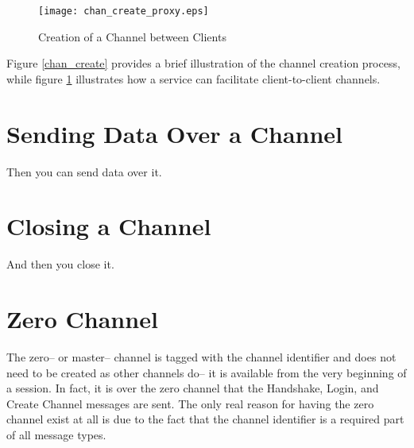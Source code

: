 \begin{figure}[!h]
  \begin{center}
    \texttt{[image: chan\_create\_proxy.eps]}
  \end{center}
  \caption{Creation of a Channel between Clients}
  \label{chan_create_proxy}
\end{figure}

\par{} Figure \ref{chan_create} provides a brief illustration of the
channel creation process, while figure \ref{chan_create_proxy}
illustrates how a service can facilitate client-to-client channels.


\section{Sending Data Over a Channel}
\par{} Then you can send data over it.


\section{Closing a Channel}
\par{} And then you close it.


\section{Zero Channel}
\par{} The zero-- or master-- channel is tagged with the channel
identifier  and does not need to be created as other
channels do-- it is available from the very beginning of a session. In
fact, it is over the zero channel that the Handshake, Login, and
Create Channel messages are sent. The only real reason for having the
zero channel exist at all is due to the fact that the channel
identifier is a required part of all message types.
